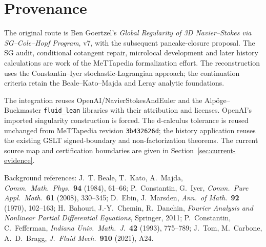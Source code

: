 \documentclass[11pt]{article}
\theoremstyle{definition}
\begin{document}
\section*{Provenance}

The original route is Ben Goertzel's \emph{Global Regularity of 3D
Navier--Stokes via SG--Cole--Hopf Program}, v7, with the subsequent
pancake-closure proposal. The SG audit, conditional cotangent repair,
microlocal development and later history calculations are work of the
MeTTapedia formalization effort. The reconstruction uses the
Constantin--Iyer stochastic-Lagrangian approach; the continuation criteria
retain the Beale--Kato--Majda and Leray analytic foundations.

The integration reuses OpenAI/NavierStokesAndEuler and the
Alp\"oge--Buckmaster \texttt{fluid\_lean} libraries with their attribution and
licenses. OpenAI's imported singularity construction is forced. The d-calculus
tolerance is reused unchanged from MeTTapedia revision
\texttt{3b432626d}; the history application reuses the existing GSLT
signed-boundary and non-factorization theorems. The current source map and
certification boundaries are given in Section~\ref{sec:current-evidence}.

Background references: J.~T. Beale, T.~Kato, A.~Majda, \emph{Comm.\ Math.\
Phys.}\ \textbf{94} (1984), 61--66; P.~Constantin, G.~Iyer, \emph{Comm.\
Pure Appl.\ Math.}\ \textbf{61} (2008), 330--345; D.~Ebin, J.~Marsden,
\emph{Ann.\ of Math.}\ \textbf{92} (1970), 102--163; H.~Bahouri,
J.-Y.~Chemin, R.~Danchin, \emph{Fourier Analysis and Nonlinear Partial
Differential Equations}, Springer, 2011; P.~Constantin, C.~Fefferman,
\emph{Indiana Univ.\ Math.\ J.}\ \textbf{42} (1993), 775--789; J.~Tom,
M.~Carbone, A.~D.~Bragg, \emph{J.\ Fluid Mech.}\ \textbf{910} (2021), A24.
\end{document}
